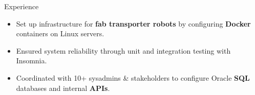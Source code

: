 \documentclass{resume} %
\begin{document}
\begin{workSection}{Experience}
	
	\experienceItem[
	company=Capital One,
	location=McLean{,} VA,
	position=Incoming Software Engineering Intern,
	duration= June 2025 - August 2025,
	]
	
	\experienceItem[
	company=Texas Instruments,
	location=Dallas{,} TX,
	position=Information Technology Intern,
	duration= May 2024 - August 2024,
	]
	\begin{itemize}
	\vspace{-0.5em}
	\itemsep -6pt {}
	\item Set up infrastructure for \textbf{fab transporter robots} by configuring \textbf{Docker} containers on Linux servers.
	\item Ensured system reliability through unit and integration testing with Insomnia.
	\item Coordinated with 10+ sysadmins \& stakeholders to configure Oracle \textbf{SQL} databases and internal \textbf{APIs}.
	\end{itemize}
	

\end{workSection}
\end{document}
